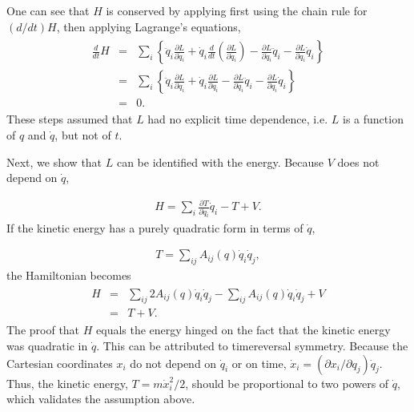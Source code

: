\documentclass[letterpaper,10pt,english]{sphinxmanual}
\begin{document}
One can see that \(H\) is conserved by applying first using the chain
rule for \((d/dt)H\), then applying Lagrange’s
equations,
\begin{equation*}
\begin{split}
\begin{eqnarray}
\frac{d}{dt}H&=&\sum_i\left\{\ddot{q}_i\frac{\partial L}{\partial\dot{q}_i}+\dot{q}_i\frac{d}{dt}\left(\frac{\partial L}{\partial\dot{q}_i}\right)-\frac{\partial L}{\partial\dot{q}_i}\ddot{q}_i-\frac{\partial L}{\partial q_i}\dot{q}_i\right\}\\
\nonumber
&=&\sum_i\left\{\ddot{q}_i\frac{\partial L}{\partial\dot{q}_i}+\dot{q}_i\frac{\partial L}{\partial q_i}-\frac{\partial L}{\partial\dot{q}_i}\ddot{q}_i-\frac{\partial L}{\partial q_i}\dot{q}_i\right\}\\
\nonumber
&=&0.
\end{eqnarray}
\end{split}
\end{equation*}
These steps assumed that \(L\) had no explicit time dependence, i.e. \(L\)
is a function of \(q\) and \(\dot{q}\), but not of \(t\).

Next, we show that \(L\) can be identified with the energy. Because \(V\) does not depend on \(\dot{q}\),




\begin{equation*}
\begin{split}
\begin{equation}
H=\sum_i\frac{\partial T}{\partial\dot{q}_i}\dot{q}_i-T+V.
\label{_auto100} \tag{136}
\end{equation}
\end{split}
\end{equation*}
If the kinetic energy has a purely quadratic form in terms of \(\dot{q}\),




\begin{equation*}
\begin{split}
\begin{equation}
T=\sum_{ij}A_{ij}(q)\dot{q}_i\dot{q}_j,
\label{_auto101} \tag{137}
\end{equation}
\end{split}
\end{equation*}
the Hamiltonian becomes
\begin{equation*}
\begin{split}
\begin{eqnarray}
H&=&\sum_{ij}2A_{ij}(q)\dot{q}_i\dot{q}_j-\sum_{ij}A_{ij}(q)\dot{q}_i\dot{q}_j+V\\
\nonumber
&=&T+V.
\end{eqnarray}
\end{split}
\end{equation*}
The proof that \(H\) equals the energy hinged on the fact that the
kinetic energy was quadratic in \(\dot{q}\). This can be attributed to
time\sphinxhyphen{}reversal symmetry. Because the Cartesian coordinates \(x_i\) do not
depend on \(\dot{q}_i\) or on time, \(\dot{x}_i=(\partial x_i/\partial
q_j)\dot{q}_j\). Thus, the kinetic energy, \(T=m\dot{x}_i^2/2\), should
be proportional to two powers of \(\dot{q}\), which validates the
assumption above.
\end{document}
